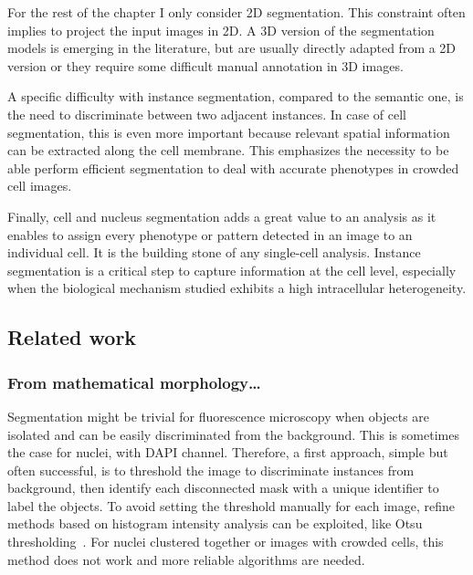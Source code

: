 For the rest of the chapter I only consider 2D segmentation.
This constraint often implies to project the input images in 2D.
A 3D version of the segmentation models is emerging in the literature, but are usually directly adapted from a 2D version or they require some difficult manual annotation in 3D images.

A specific difficulty with instance segmentation, compared to the semantic one, is the need to discriminate between two adjacent instances.
In case of cell segmentation, this is even more important because relevant spatial information can be extracted along the cell membrane.
This emphasizes the necessity to be able perform efficient segmentation to deal with accurate phenotypes in crowded cell images.

Finally, cell and nucleus segmentation adds a great value to an analysis as it enables to assign every phenotype or pattern detected in an image to an individual cell.
It is the building stone of any single-cell analysis.
Instance segmentation is a critical step to capture information at the cell level, especially when the biological mechanism studied exhibits a high intracellular heterogeneity.


\subsection{Related work}
\label{subsec:segmentation_related_work}

\subsubsection{From mathematical morphology\dots}

Segmentation might be trivial for fluorescence microscopy when objects are isolated and can be easily discriminated from the background.
This is sometimes the case for nuclei, with DAPI channel.
Therefore, a first approach, simple but often successful, is to threshold the image to discriminate instances from background, then identify each disconnected mask with a unique identifier to label the objects.
To avoid setting the threshold manually for each image, refine methods based on histogram intensity analysis can be exploited, like Otsu thresholding~\cite{Otsu_1979}.
For nuclei clustered together or images with crowded cells, this method does not work and more reliable algorithms are needed.

